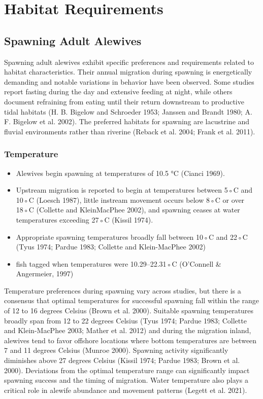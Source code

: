 \documentclass[
]{book}
\providecommand{\tightlist}{%
  \setlength{\itemsep}{0pt}\setlength{\parskip}{0pt}}
\begin{document}
\hypertarget{habitat-requirements}{%
\section{Habitat Requirements}\label{habitat-requirements}}

\hypertarget{spawning-adult-alewives}{%
\subsection{Spawning Adult Alewives}\label{spawning-adult-alewives}}

Spawning adult alewives exhibit specific preferences and requirements related to habitat characteristics.
Their annual migration during spawning is energetically demanding and notable variations in behavior have been observed.
Some studies report fasting during the day and extensive feeding at night, while others document refraining from eating until their return downstream to productive tidal habitats (H. B. Bigelow and Schroeder 1953; Janssen and Brandt 1980; A. F. Bigelow et al. 2002).
The preferred habitats for spawning are lacustrine and fluvial environments rather than riverine (Reback et al. 2004; Frank et al. 2011).

\hypertarget{temperature}{%
\subsubsection{Temperature}\label{temperature}}

\begin{itemize}
\tightlist
\item
  Alewives begin spawning at temperatures of 10.5 °C (Cianci 1969).
\item
  Upstream migration is reported to begin at temperatures between 5◦C and 10◦C (Loesch 1987), little instream movement occurs below 8◦C or over 18◦C (Collette and KleinMacPhee 2002), and spawning ceases at water temperatures exceeding 27◦C (Kissil 1974).
\item
  Appropriate spawning temperatures broadly fall between 10◦C and 22◦C (Tyus 1974; Pardue 1983; Collette and Klein-MacPhee 2002)
\item
  fish tagged when temperatures were 10.29--22.31◦C (O'Connell \& Angermeier, 1997)
\end{itemize}

Temperature preferences during spawning vary across studies, but there is a consensus that optimal temperatures for successful spawning fall within the range of 12 to 16 degrees Celsius (Brown et al. 2000).
Suitable spawning temperatures broadly span from 12 to 22 degrees Celsius (Tyus 1974; Pardue 1983; Collette and Klein-MacPhee 2003; Mather et al. 2012) and during the migration inland, alewives tend to favor offshore locations where bottom temperatures are between 7 and 11 degrees Celsius (Munroe 2000).
Spawning activity significantly diminishes above 27 degrees Celsius (Kissil 1974; Pardue 1983; Brown et al. 2000).
Deviations from the optimal temperature range can significantly impact spawning success and the timing of migration.
Water temperature also plays a critical role in alewife abundance and movement patterns (Legett et al. 2021).
\end{document}
